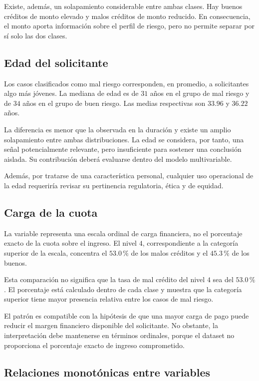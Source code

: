 Existe, además, un solapamiento considerable entre ambas clases. Hay
buenos créditos de monto elevado y malos créditos de monto reducido. En
consecuencia, el monto aporta información sobre el perfil de riesgo, pero
no permite separar por sí solo las dos clases.

\subsection{Edad del solicitante}

Los casos clasificados como mal riesgo corresponden, en promedio, a
solicitantes algo más jóvenes. La mediana de edad es de \(31\) años en
el grupo de mal riesgo y de \(34\) años en el grupo de buen riesgo. Las
medias respectivas son \(33.96\) y \(36.22\) años.

La diferencia es menor que la observada en la duración y existe un
amplio solapamiento entre ambas distribuciones. La edad se considera,
por tanto, una señal potencialmente relevante, pero insuficiente para
sostener una conclusión aislada. Su contribución deberá evaluarse dentro
del modelo multivariable.

Además, por tratarse de una característica personal, cualquier uso
operacional de la edad requeriría revisar su pertinencia regulatoria,
ética y de equidad.

\subsection{Carga de la cuota}

La variable  representa una escala ordinal de carga
financiera, no el porcentaje exacto de la cuota sobre el ingreso. El
nivel \(4\), correspondiente a la categoría superior de la escala,
concentra el \(53.0\,\%\) de los malos créditos y el \(45.3\,\%\) de
los buenos.

Esta comparación no significa que la tasa de mal crédito del nivel
\(4\) sea del \(53.0\,\%\). El porcentaje está calculado dentro de cada
clase y muestra que la categoría superior tiene mayor presencia relativa
entre los casos de mal riesgo.

El patrón es compatible con la hipótesis de que una mayor carga de pago
puede reducir el margen financiero disponible del solicitante. No
obstante, la interpretación debe mantenerse en términos ordinales,
porque el dataset no proporciona el porcentaje exacto de ingreso
comprometido.

\subsection{Relaciones monotónicas entre variables}

